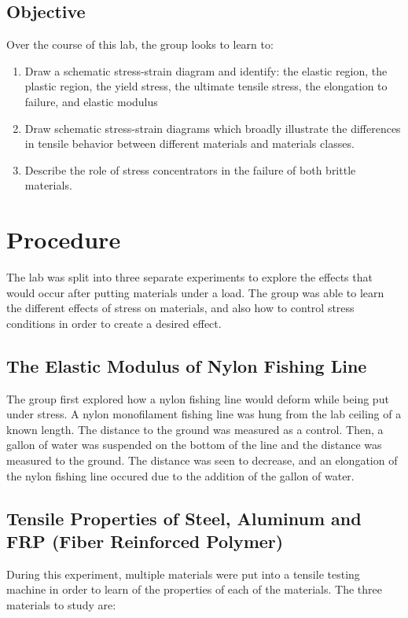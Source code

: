 \documentclass{article}
\begin{document}
\subsection{Objective}
Over the course of this lab, the group looks to learn to:
\begin{enumerate}
\item Draw a schematic stress-strain diagram and identify: the elastic region, the plastic region, the yield stress, the ultimate tensile stress, the elongation to failure, and elastic modulus
\item Draw schematic stress-strain diagrams which broadly illustrate the differences in tensile behavior between different materials and materials classes.
\item Describe the role of stress concentrators in the failure of both brittle materials. 
\end{enumerate}

\section{Procedure}
The lab was split into three separate experiments to explore the effects that would occur after putting materials under a load. The group was able to learn the different effects of stress on materials, and also how to control stress conditions in order to create a desired effect. 

\subsection{The Elastic Modulus of Nylon Fishing Line}
The group first explored how a nylon fishing line would deform while being put under stress. A nylon monofilament fishing line was hung from the lab ceiling of a known length. The distance to the ground was measured as a control. Then, a gallon of water was suspended on the bottom of the line and the distance was measured to the ground. The distance was seen to decrease, and an elongation of the nylon fishing line occured due to the addition of the gallon of water. 

\subsection{Tensile Properties of Steel, Aluminum and FRP (Fiber Reinforced Polymer)}
During this experiment, multiple materials were put into a tensile testing machine in order to learn of the properties of each of the materials. The three materials to study are: 
\end{document}
